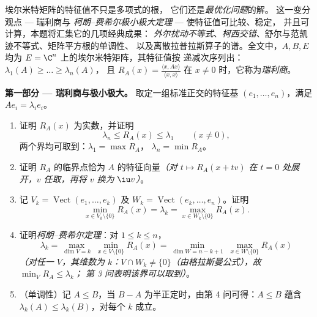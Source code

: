 \begin{problem}\label{pb:b2:hermitian:1}
埃尔米特矩阵的特征值不只是多项式的根，
它们还是\emph{最优化问题}的解。
这一变分观点 --- 瑞利商与
\emph{柯朗–费希尔极小极大定理} --- 使特征值可比较、稳定，
并且可计算，本题将汇集它的几项经典成果：
\emph{外尔扰动不等式}、\emph{柯西交错}、舒尔与范凯
迹不等式、矩阵平方根的单调性、
以及离散拉普拉斯算子的谱。全文中，$A, B,
E$ 均为 $E = \C^n$ 上的埃尔米特矩阵，其特征值按
递减次序列出：$\lambda_1(A) \geq \dots \geq \lambda_n(A)$，
且 $R_A(x) = \frac{\langle x, Ax\rangle}{\langle x, x\rangle}$
在 $x \neq 0$ 时，它称为\emph{瑞利商}。

\medskip
\noindent\textbf{第一部分 --- 瑞利商与极小极大。}
取定一组标准正交的特征基 $(e_1, \dots, e_n)$，满足 $Ae_i =
\lambda_ie_i$。
\begin{enumerate}
  \item 证明 $R_A(x)$ 为实数，并证明
        \[
        \lambda_n \leq R_A(x) \leq \lambda_1
        \qquad (x \neq 0),
        \]
        两个界均可取到：$\lambda_1 = \max R_A$，
        $\lambda_n = \min R_A$。
  \item 证明 $R_A$ 的临界点恰为
        $A$ 的特征向量\emph{（对 $t \mapsto R_A(x +
        tv)$ 在 $t = 0$ 处展开，$v$ 任取，再将 $v$ 换为
        $\iu v$）}。
  \item 记 $V_k = \operatorname{Vect}(e_1, \dots, e_k)$ 及
        $W_k = \operatorname{Vect}(e_k, \dots, e_n)$。证明
        \[
        \min_{x \in V_k\setminus\{0\}} R_A(x) = \lambda_k
        = \max_{x \in W_k\setminus\{0\}} R_A(x) .
        \]
  \item 证明\emph{柯朗–费希尔定理}：对 $1 \leq
        k \leq n$，
        \[
        \lambda_k = \max_{\dim V = k}\;\min_{x \in
        V\setminus\{0\}} R_A(x)
        = \min_{\dim W = n-k+1}\;\max_{x \in
        W\setminus\{0\}} R_A(x)
        \]
        \emph{（对任一 $V$，其维数为 $k$：$V \cap W_k \neq
        \{0\}$（由格拉斯曼公式），故 $\min_V R_A \leq \lambda_k$；
        第 3 问表明该界可以取到）}。
  \item （单调性）记 $A \leq B$，当 $B - A$
        为半正定时，由第 4 问可得：$A \leq
        B$ 蕴含 $\lambda_k(A) \leq \lambda_k(B)$，对每个
        $k$ 成立。
\end{enumerate}


\end{problem}
